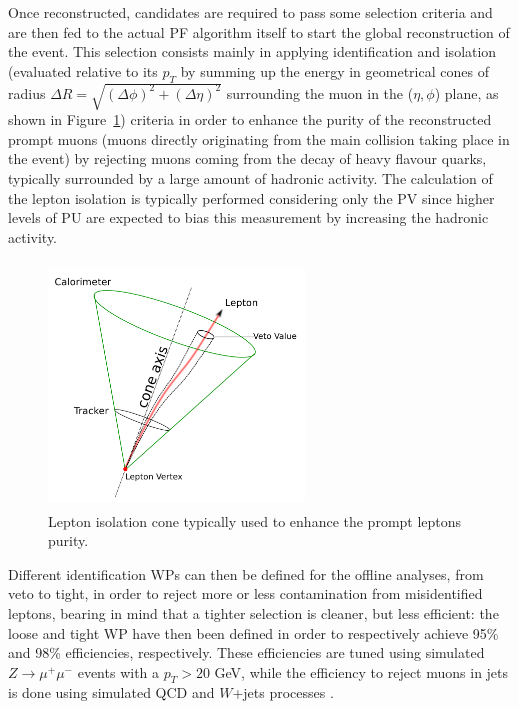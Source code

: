 \documentclass[a4paper, 10pt, openright]{report}
\begin{document}
Once reconstructed, candidates are required to pass some selection criteria and are then fed to the actual \ac{PF} algorithm itself to start the global reconstruction of the event. This selection consists mainly in applying identification and isolation (evaluated relative to its $p_T$ by summing up the energy in geometrical cones of radius $\Delta R = \sqrt{(\Delta \phi)^2 + (\Delta \eta)^2}$ surrounding the muon in the ($\eta, \phi$) plane, as shown in Figure~\ref{fig:IsoCone}) criteria in order to enhance the purity of the reconstructed prompt muons (muons directly originating from the main collision taking place in the event) by rejecting muons coming from the decay of heavy flavour quarks, typically surrounded by a large amount of hadronic activity. The calculation of the lepton isolation is typically performed considering only the \ac{PV} since higher levels of \ac{PU} are expected to bias this measurement by increasing the hadronic activity.

\begin{figure}[htbp]
\begin{center}
\includegraphics[width=6.8cm, height=6.5cm]{figs/IsoCone.png}
\caption{Lepton isolation cone typically used to enhance the prompt leptons purity.}
\label{fig:IsoCone}
\end{center}
\end{figure}

Different identification \acfp{WP} can then be defined for the offline analyses, from veto to tight, in order to reject more or less contamination from misidentified leptons, bearing in mind that a tighter selection is cleaner, but less efficient: the loose and tight \ac{WP} have then been defined in order to respectively achieve 95\% and 98\% efficiencies, respectively. These efficiencies are tuned using simulated $Z \rightarrow \mu^+ \mu^-$ events with a $p_T > 20$ GeV, while the efficiency to reject muons in jets is done using simulated QCD and $W$+jets processes \cite{MuonSystemsEff}.
\end{document}

